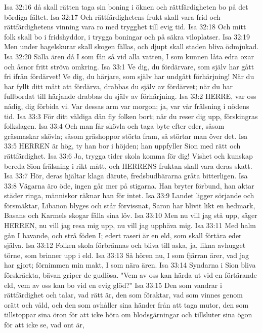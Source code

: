 Isa 32:16  då skall rätten taga sin boning i öknen och rättfärdigheten bo på det bördiga fältet.
Isa 32:17  Och rättfärdighetens frukt skall vara frid och rättfärdighetens vinning vara ro med trygghet till evig tid.
Isa 32:18  Och mitt folk skall bo i fridshyddor, i trygga boningar och på säkra viloplatser.
Isa 32:19  Men under hagelskurar skall skogen fällas, och djupt skall staden bliva ödmjukad.
Isa 32:20  Sälla ären då I som fån så vid alla vatten, I som kunnen låta edra oxar och åsnor fritt ströva omkring.
Isa 33:1  Ve dig, du fördärvare, som själv har gått fri ifrån fördärvet! Ve dig, du härjare, som själv har undgått förhärjning! När du har fyllt ditt mått att fördärva, drabbas du själv av fördärvet; när du har fullbordat till härjande drabbas du själv av förhärjning.
Isa 33:2  HERRE, var oss nådig, dig förbida vi. Var dessas arm var morgon; ja, var vår frälsning i nödens tid.
Isa 33:3  För ditt väldiga dån fly folken bort; när du reser dig upp, förskingras folkslagen.
Isa 33:4  Och man får skövla och taga byte efter eder, såsom gräsmaskar skövla; såsom gräshoppor störta fram, så störtar man över det.
Isa 33:5  HERREN är hög, ty han bor i höjden; han uppfyller Sion med rätt och rättfärdighet.
Isa 33:6  Ja, trygga tider skola komma för dig! Vishet och kunskap bereda Sion frälsning i rikt mått, och HERRENS fruktan skall vara deras skatt.
Isa 33:7  Hör, deras hjältar klaga därute, fredsbudbärarna gråta bitterligen.
Isa 33:8  Vägarna äro öde, ingen går mer på stigarna. Han bryter förbund, han aktar städer ringa, människor räknar han för intet.
Isa 33:9  Landet ligger sörjande och försmäktar, Libanon blyges och står förvissnat, Saron har blivit likt en hedmark, Basans och Karmels skogar fälla sina löv.
Isa 33:10  Men nu vill jag stå upp, säger HERREN, nu vill jag resa mig upp, nu vill jag upphäva mig.
Isa 33:11  Med halm gån I havande, och strå föden I; edert raseri är en eld, som skall förtära eder själva.
Isa 33:12  Folken skola förbrännas och bliva till aska, ja, likna avhugget törne, som brinner upp i eld.
Isa 33:13  Så hören nu, I som fjärran ärer, vad jag har gjort; förnimmen min makt, I som nära ären.
Isa 33:14  Syndarna i Sion bliva förskräckta, bävan griper de gudlösa. "Vem av oss kan härda ut vid en förtärande eld, vem av oss kan bo vid en evig glöd?"
Isa 33:15  Den som vandrar i rättfärdighet och talar, vad rätt är, den som föraktar, vad som vinnes genom orätt och våld, och den som avhåller sina händer från att taga mutor, den som tillstoppar sina öron för att icke höra om blodsgärningar och tillsluter sina ögon för att icke se, vad ont är,
